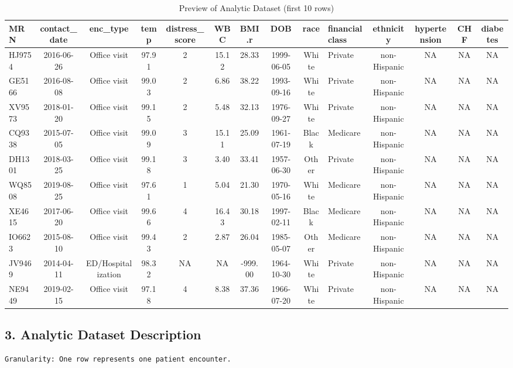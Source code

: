 \documentclass[
  letterpaper,
  DIV=11,
  numbers=noendperiod]{scrartcl}
\begin{document}
\begin{longtable}[t]{lcccccccclcccc}
\caption{\label{tab:unnamed-chunk-4}Preview of Analytic Dataset (first 10 rows)}\\
\toprule
MRN & contact\_date & enc\_type & temp & distress\_score & WBC & BMI.r & DOB & race & financialclass & ethnicity & hypertension & CHF & diabetes\\
\midrule
HJ9754 & 2016-06-26 & Office visit & 97.91 & 2 & 15.12 & 28.33 & 1999-06-05 & White & Private & non-Hispanic & NA & NA & NA\\
GE5166 & 2016-08-08 & Office visit & 99.03 & 2 & 6.86 & 38.22 & 1993-09-16 & White & Private & non-Hispanic & NA & NA & NA\\
XV9573 & 2018-01-20 & Office visit & 99.15 & 2 & 5.48 & 32.13 & 1976-09-27 & White & Private & non-Hispanic & NA & NA & NA\\
CQ9338 & 2015-07-05 & Office visit & 99.09 & 3 & 15.11 & 25.09 & 1961-07-19 & Black & Medicare & non-Hispanic & NA & NA & NA\\
DH1301 & 2018-03-25 & Office visit & 99.18 & 3 & 3.40 & 33.41 & 1957-06-30 & Other & Private & non-Hispanic & NA & NA & NA\\
\addlinespace
WQ8508 & 2019-08-25 & Office visit & 97.61 & 1 & 5.04 & 21.30 & 1970-05-16 & White & Medicare & non-Hispanic & NA & NA & NA\\
XE4615 & 2017-06-20 & Office visit & 99.66 & 4 & 16.43 & 30.18 & 1997-02-11 & Black & Medicare & non-Hispanic & NA & NA & NA\\
IO6623 & 2015-08-10 & Office visit & 99.43 & 2 & 2.87 & 26.04 & 1985-05-07 & Other & Medicare & non-Hispanic & NA & NA & NA\\
JV9469 & 2014-04-11 & ED/Hospitalization & 98.32 & NA & NA & -999.00 & 1964-10-30 & White & Private & non-Hispanic & NA & NA & NA\\
NE9449 & 2019-02-15 & Office visit & 97.18 & 4 & 8.38 & 37.36 & 1966-07-20 & White & Private & non-Hispanic & NA & NA & NA\\
\bottomrule
\end{longtable}

\subsection{3. Analytic Dataset
Description}\label{analytic-dataset-description}

\begin{verbatim}
Granularity: One row represents one patient encounter.
\end{verbatim}
\end{document}
